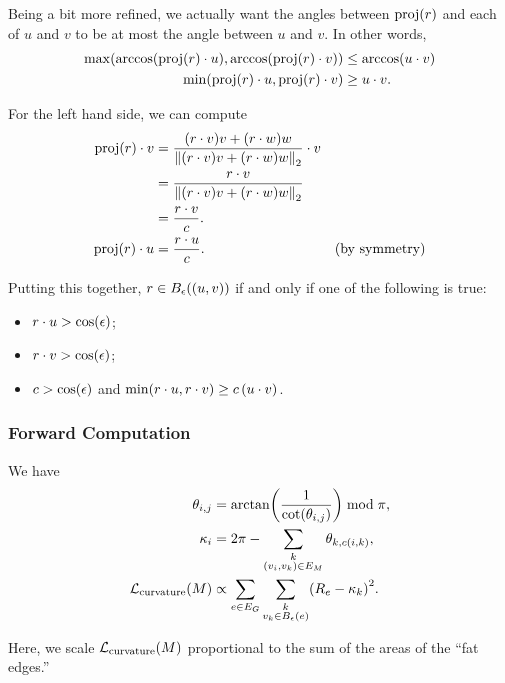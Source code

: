 Being a bit more refined, we actually want the angles between \(\proj\pof{r}\) and each of \(u\) and \(v\) to be at most the angle between \(u\) and \(v\). In other words, \begin{align*}
	\max\pof{\arccos\pof{\proj\pof{r} \cdot u}, \arccos\pof{\proj\pof{r} \cdot v}} &\le \arccos\pof{u \cdot v} \\
	\min\pof{\proj\pof{r} \cdot u, \proj\pof{r} \cdot v} &\ge u \cdot v.
\end{align*}

For the left hand side, we can compute
\begin{align*}
	\proj\pof{r} \cdot v &= \frac{\pof{r \cdot v}v + \pof{r \cdot w}w}{\norm{\pof{r \cdot v}v + \pof{r \cdot w}w}_2} \cdot v \\
		&= \frac{r \cdot v}{\norm{\pof{r \cdot v}v + \pof{r \cdot w}w}_2} \\
		&= \frac{r \cdot v}{c}. \\
	\proj\pof{r} \cdot u &= \frac{r \cdot u}{c}. & \text{(by symmetry)}
\end{align*}

Putting this together, \(r \in B_\epsilon\pof{\pof{u, v}}\) if and only if one of the following is true:
\begin{itemize}
	\item
	\(r \cdot u > \cos\pof{\epsilon}\);
	\item
	\(r \cdot v > \cos\pof{\epsilon}\);
	\item
	\(c > \cos\pof{\epsilon}\) and \(\min\pof{r \cdot u, r \cdot v} \ge c\,\pof{u \cdot v}\).
\end{itemize}

\subsubsection{Forward Computation}
We have \begin{align*}
	\theta_{i, j} &= \arctan\pof{\frac{1}{\cot\pof{\theta_{i, j}}}} \bmod \pi, \\
	\kappa_i &= 2\pi - \sum_{\substack{k \\ \pof{v_i, v_k} \in E_M}} \theta_{k, c\pof{i, k}}, \\
	\mathcal{L}_{\mathrm{curvature}}\pof{M} &\propto \sum_{e \in E_G} \sum_{\substack{k \\ v_k \in B_\epsilon\pof{e}}} \pof{R_e - \kappa_k}^2.
\end{align*}

Here, we scale \(\mathcal{L}_{\mathrm{curvature}}\pof{M}\) proportional to the sum of the areas of the ``fat edges.''


